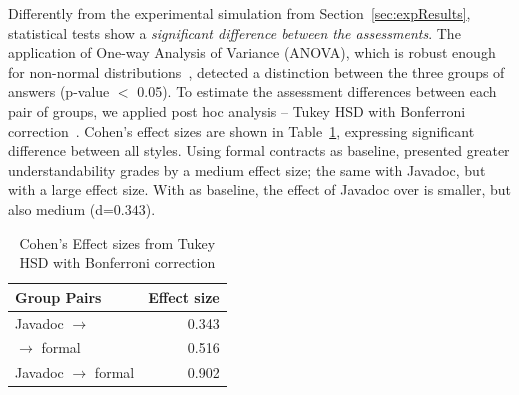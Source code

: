 Differently from the experimental simulation from Section~\ref{sec:expResults}, statistical tests show a \emph{significant difference between the assessments}. The application of One-way Analysis of Variance (ANOVA), which is robust enough for non-normal distributions~\cite{statistical}, detected a distinction between the three groups of answers (p-value $<$ 0.05). 
To estimate the assessment differences between each pair of groups, we applied post hoc analysis -- Tukey HSD with Bonferroni correction~\cite{statistical}. Cohen's effect sizes are shown in Table~\ref{tab:effect}, expressing significant difference between all styles. Using formal contracts as baseline, \contractjdoc{} presented greater understandability grades by a medium effect size; the same with Javadoc, but with a large effect size. With \contractjdoc{} as baseline, the effect of Javadoc over \contractjdoc{} is smaller, but also medium (d=$0.343$).

\begin{table}
\centering
\caption{Cohen's Effect sizes from Tukey HSD with Bonferroni correction}
\label{tab:effect}
\begin{tabular}{l|r} 
\toprule
\textbf{Group Pairs}                                                & \textbf{Effect size}  \\ 
\toprule
Javadoc $\rightarrow$ \contractjdoc{} & 0.343                 \\
\contractjdoc{} $\rightarrow$ formal  & 0.516                 \\
Javadoc $\rightarrow$ formal          & 0.902                \\
\hline
\end{tabular}
\end{table}




% 
% 
% 
% 
% 
% 




